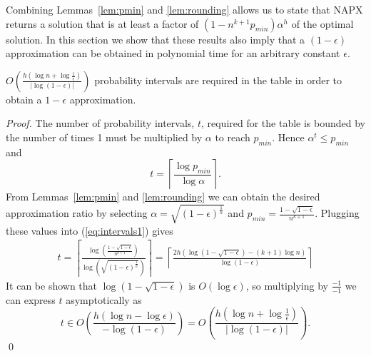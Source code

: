 \documentclass[10pt]{llncs}       \usepackage{graphicx,subfigure}
\begin{document}
Combining Lemmas~\ref{lem:pmin} and \ref{lem:rounding} allows us to state
that NAPX returns a solution that is at least a factor 
of $(1-n^{k+1}p_{min})\alpha^h$ of the optimal solution.  In this section we
show that these results also imply that a $(1-\epsilon)$ approximation can be
obtained in polynomial time for an arbitrary constant $\epsilon$.

\begin{lemma}
  \label{lem:tsize}
$\displaystyle  O\left(\frac{h \left(\log{n} + \log{\frac{1}{\epsilon}}\right)}
{|\log (1 - \epsilon)| }\right)$ 
probability intervals are required in the table in order to obtain 
a $1 - \epsilon$ approximation.
\end{lemma}
\begin{proof}
The number of probability intervals, $t$, required for the table is bounded by
the number of times 1 must be multiplied by $\alpha$ to reach $p_{min}$.  
Hence $\alpha^t \leq p_{min}$ and
\begin{equation}
  \label{eq:intervals1}
  t = \left\lceil  \frac{\log p_{min}}{\log \alpha} \right\rceil.
\end{equation}
From  Lemmas~\ref{lem:pmin} and \ref{lem:rounding} we can obtain the desired
approximation ratio by selecting $\alpha = \sqrt{(1-\epsilon)^{\frac{1}{h}}}$
and $p_{min} = \frac{1-\sqrt{1-\epsilon}}{n^{k+1}}$. Plugging these values into 
(\ref{eq:intervals1}) gives
\begin{align*}
t =  \left\lceil \frac{\log\left( \frac{1-\sqrt{1-\epsilon}}{n^{k+1}} \right)}
  {\log \left(\sqrt{(1-\epsilon)^{\frac{1}{h}}} \right)}\right\rceil =
\left\lceil \frac{2h(\log (1-\sqrt{1-\epsilon}) - (k+1)\log{n})}
  {\log (1-\epsilon)}\right\rceil
\end{align*}
It can be shown that $\log(1 - \sqrt{1-\epsilon})$ is $O(\log{\epsilon})$,  so 
multiplying by $\frac{-1}{-1}$ we can express $t$ asymptotically as 
\begin{equation*}
  t \in O\left(\frac{h \left(\log{n} - \log{\epsilon}\right)}
{-\log(1-\epsilon)}\right) 
=
O\left(\frac{h \left(\log{n} + \log{\frac{1}{\epsilon}}\right)}
{|\log(1-\epsilon)|}\right). 
\end{equation*}\qed
\end{proof}
\end{document}
